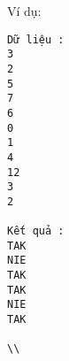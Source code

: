 Ví dụ:
\begin{verbatim}
Dữ liệu :
3
2
5
7
6
0
1
4
12
3
2

Kết quả :
TAK
NIE
TAK
TAK
NIE
TAK

\\\end{verbatim}